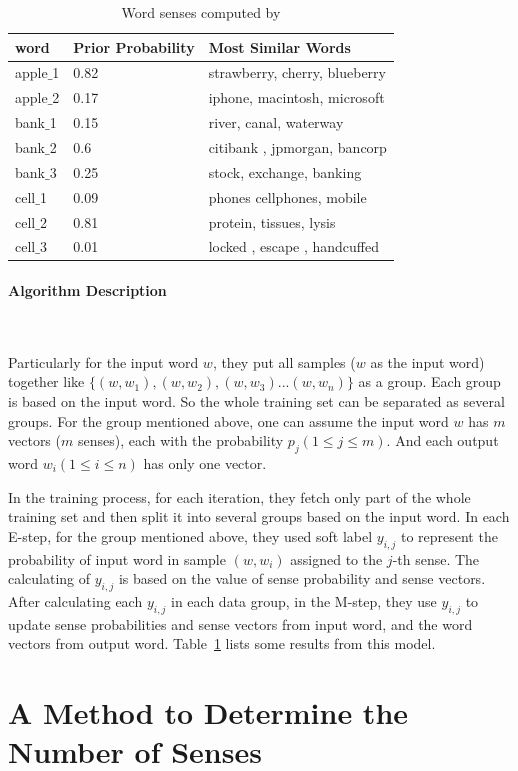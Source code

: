 \begin{table}[tb]
	\begin{center}
		\caption{Word senses computed by \citeauthor{TianDaiEtAl2014}}
		\label{tab:tian}
		\vspace{2mm}
		\begin{tabular}{|l|l|l|}
			\hline
			word & Prior Probability & Most Similar Words \\
			\hline  
			apple$\_$1 & 0.82 & strawberry, cherry, blueberry\\
			\hline
			apple$\_$2 & 0.17 & iphone, macintosh, microsoft\\
			\hline
			bank$\_$1 & 0.15 & river, canal, waterway\\
			\hline
			bank$\_$2 & 0.6 & citibank , jpmorgan, bancorp\\
			\hline
			bank$\_$3 & 0.25 & stock, exchange, banking\\
			\hline
			cell$\_$1 & 0.09 & phones cellphones, mobile\\
			\hline
			cell$\_$2 & 0.81 & protein, tissues, lysis\\
			\hline
			cell$\_$3 & 0.01 &locked , escape , handcuffed\\
			\hline
		\end{tabular}
	\end{center}
	
\end{table}

\paragraph{Algorithm Description}\ 

Particularly for the input word $w$, they put all samples ($w$ as the input word) together like $\{(w, w_1), (w, w_2), (w, w_3) ... (w, w_n)\}$ as a group. Each group is based on the input word. So the whole training set can be separated as several groups. For the group mentioned above, one can assume the input word $w$ has $m$ vectors ($m$ senses), each with the probability $p_j (1 \leq j \leq m)$. And each output word $w_i (1 \leq i\leq n)$ has only one vector. 

 In the training process, for each iteration, they fetch only part of the whole training set and then split it into several groups based on the input word. In each E-step, for the group mentioned above, they used soft label $y_{i,j}$ to represent the probability of input word in sample $(w,w_i)$ assigned to the $j$-th sense. The calculating of $y_{i,j}$ is based on the value of sense probability and sense vectors. After calculating each $y_{i,j}$ in each data group, in the M-step, they use $y_{i,j}$ to update sense probabilities and sense vectors from input word, and the word vectors from output word. Table~\ref{tab:tian} lists some results from this model.

\section{A Method to Determine the Number of Senses}
\cite{NeelakantanShankarEtAl2015} 
